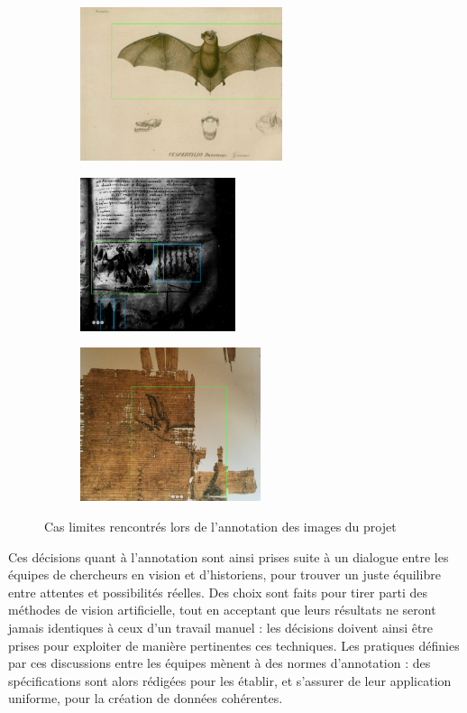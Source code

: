 	\begin{figure}[h]
		\begin{subfigure}{0.37\linewidth}
			\centering
			\includegraphics[height=4.5cm]{images/vhs_edge_case1.png}
		\end{subfigure}
		\hspace{1pt}
		\begin{subfigure}{0.30\linewidth}
			\centering
			\includegraphics[height=4.5cm]{images/vhs_edge_case2.png}
		\end{subfigure}
		\hspace{1pt}
		\begin{subfigure}{0.25\linewidth}
			\centering
			\includegraphics[height=4.5cm]{images/vhs_edge_case3.png}
		\end{subfigure}
		\caption{Cas limites rencontrés lors de l'annotation des images du projet \vhs}
		\label{fig:edge_cases_vhs}
	\end{figure}

	Ces décisions quant à l'annotation sont ainsi prises suite à un dialogue entre les équipes de chercheurs en vision et d'historiens, pour trouver un juste équilibre entre attentes et possibilités réelles. Des choix sont faits pour tirer parti des méthodes de vision artificielle, tout en acceptant que leurs résultats ne seront jamais identiques à ceux d'un travail manuel : les décisions doivent ainsi être prises pour exploiter de manière pertinentes ces techniques. Les pratiques définies par ces discussions entre les équipes mènent à des normes d'annotation : des spécifications sont alors rédigées pour les établir, et s'assurer de leur application uniforme, pour la création de données cohérentes.


